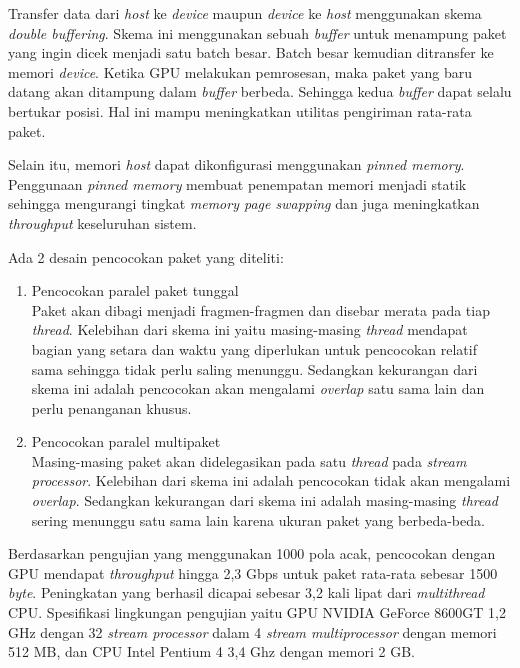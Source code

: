     Transfer data dari \emph{host} ke \emph{device} maupun \emph{device} ke \emph{host} menggunakan skema \emph{double buffering}. Skema ini menggunakan sebuah \emph{buffer} untuk menampung paket yang ingin dicek menjadi satu batch besar. Batch besar kemudian ditransfer ke memori \emph{device}. Ketika GPU melakukan pemrosesan, maka paket yang baru datang akan ditampung dalam \emph{buffer} berbeda. Sehingga kedua \emph{buffer} dapat selalu bertukar posisi. Hal ini mampu meningkatkan utilitas pengiriman rata-rata paket. 
    
    Selain itu, memori \emph{host} dapat dikonfigurasi menggunakan \emph{pinned memory}. Penggunaan \emph{pinned memory} membuat penempatan memori menjadi statik sehingga mengurangi tingkat \emph{memory page swapping} dan juga meningkatkan \emph{throughput} keseluruhan sistem.

    Ada 2 desain pencocokan paket yang diteliti:
    \begin{enumerate}

      \item Pencocokan paralel paket tunggal \\
      Paket akan dibagi menjadi fragmen-fragmen dan disebar merata pada tiap \emph{thread}. Kelebihan dari skema ini yaitu masing-masing \emph{thread} mendapat bagian yang setara dan waktu yang diperlukan untuk pencocokan relatif sama sehingga tidak perlu saling menunggu. Sedangkan kekurangan dari skema ini adalah pencocokan akan mengalami \emph{overlap} satu sama lain dan perlu penanganan khusus.

      \item Pencocokan paralel multipaket \\
      Masing-masing paket akan didelegasikan pada satu \emph{thread} pada \emph{stream processor}. Kelebihan dari skema ini adalah pencocokan tidak akan mengalami \emph{overlap}. Sedangkan kekurangan dari skema ini adalah masing-masing \emph{thread} sering menunggu satu sama lain karena ukuran paket yang berbeda-beda.

    \end{enumerate}

    Berdasarkan pengujian yang menggunakan 1000 pola acak, pencocokan dengan GPU mendapat \emph{throughput} hingga 2,3 Gbps untuk paket rata-rata sebesar 1500 \emph{byte}. Peningkatan yang berhasil dicapai sebesar 3,2 kali lipat dari \emph{multithread} CPU. Spesifikasi lingkungan pengujian yaitu GPU NVIDIA GeForce 8600GT 1,2 GHz dengan 32 \emph{stream processor} dalam 4 \emph{stream multiprocessor} dengan memori 512 MB, dan CPU Intel Pentium 4 3,4 Ghz dengan memori 2 GB.

